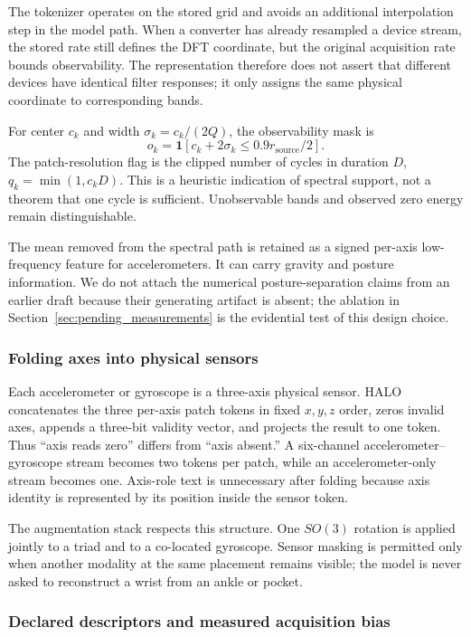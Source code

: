 The tokenizer operates on the stored grid and avoids an additional interpolation step in the model
path. When a converter has already resampled a device stream, the stored rate still defines the DFT
coordinate, but the original acquisition rate bounds observability. The representation therefore
does not assert that different devices have identical filter responses; it only assigns the same
physical coordinate to corresponding bands.

For center $c_k$ and width $\sigma_k=c_k/(2Q)$, the observability mask is
\[
 o_k=\mathbf{1}\!\left[c_k+2\sigma_k\leq0.9r_{\mathrm{source}}/2\right].
\]
The patch-resolution flag is the clipped number of cycles in duration $D$,
$q_k=\min(1,c_kD)$. This is a heuristic indication of spectral support, not a theorem that one cycle
is sufficient. Unobservable bands and observed zero energy remain distinguishable.

The mean removed from the spectral path is retained as a signed per-axis low-frequency feature for
accelerometers. It can carry gravity and posture information. We do not attach the numerical
posture-separation claims from an earlier draft because their generating artifact is absent; the
ablation in Section~\ref{sec:pending_measurements} is the evidential test of this design choice.

\subsubsection{Folding axes into physical sensors}
\label{sec:sensor_grouping}

Each accelerometer or gyroscope is a three-axis physical sensor. HALO concatenates the three
per-axis patch tokens in fixed $x,y,z$ order, zeros invalid axes, appends a three-bit validity
vector, and projects the result to one token. Thus ``axis reads zero'' differs from ``axis absent.''
A six-channel accelerometer--gyroscope stream becomes two tokens per patch, while an
accelerometer-only stream becomes one. Axis-role text is unnecessary after folding because axis
identity is represented by its position inside the sensor token.

The augmentation stack respects this structure. One $SO(3)$ rotation is applied jointly to a triad
and to a co-located gyroscope. Sensor masking is permitted only when another modality at the same
placement remains visible; the model is never asked to reconstruct a wrist from an ankle or pocket.

\subsubsection{Declared descriptors and measured acquisition bias}
\label{sec:conditioning}

